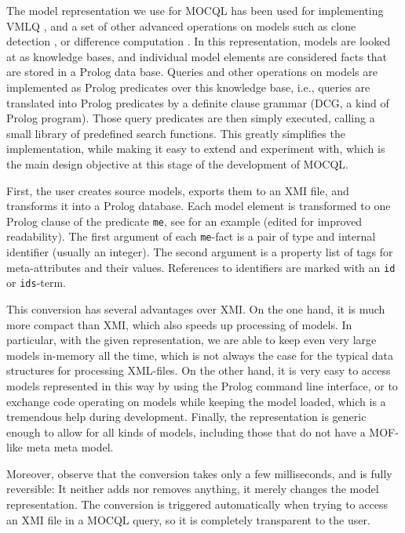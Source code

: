 \documentclass{llncs}
\newcommand{\MMQ}{MOCQL\xspace}
\begin{document}
The model representation we use for \MMQ has been used for implementing VMLQ \cite{stoerrle:mq3b:jvlc}, and a set of other advanced operations on models such as clone detection \cite{stoerrle:mc1b:jsosym}, or difference computation \cite{stoerrle:mvc4:presentation}. In this representation, models are looked at as knowledge bases, and individual model elements are considered facts that are stored in a Prolog data base. Queries and other operations on models are implemented as Prolog predicates over this knowledge base, i.e., queries are translated into Prolog predicates by a definite clause grammar (DCG, a kind of Prolog program). Those query predicates are then simply executed, calling a small library of predefined search functions. This greatly simplifies the implementation, while making it easy to extend and experiment with, which is the main design objective at this stage of the development of \MMQ.

First, the user creates source models, exports them to an XMI file, and transforms it into a Prolog database. Each model element is transformed to one Prolog clause of the predicate \texttt{me}, see  for an example (edited for improved readability). The first argument of each \texttt{me}-fact is a pair of type and internal identifier (usually an integer). The second argument is a property list of tags for meta-attributes and their values. References to identifiers are marked with an \texttt{id} or \texttt{ids}-term.


This conversion has several advantages over XMI. On the one hand, it is much more compact than XMI, which also speeds up processing of models. In particular, with the given representation, we are able to keep even very large models in-memory all the time, which is not always the case for the typical data structures for processing XML-files. On the other hand, it is very easy to access models represented in this way by using the Prolog command line interface, or to exchange code operating on models while keeping the model loaded, which is a tremendous help during development. Finally, the representation is generic enough to allow for all kinds of models, including those that do not have a MOF-like meta meta model.

Moreover, observe that the conversion takes only a few milliseconds, and is fully reversible: It neither adds nor removes anything, it merely changes the model representation. The conversion is triggered automatically when trying to access an XMI file in a \MMQ query, so it is completely transparent to the user.
\end{document}
